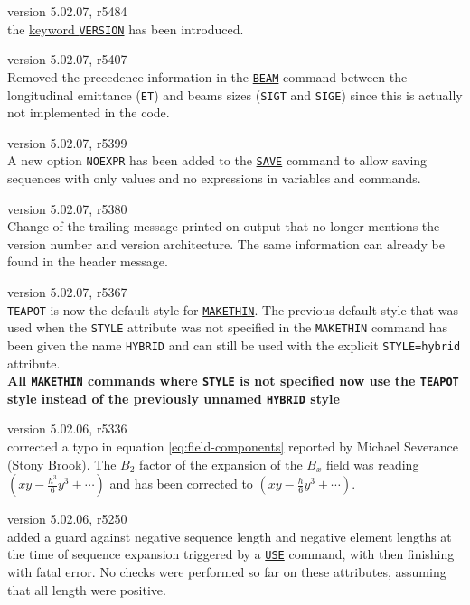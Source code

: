 \begin{madlist}
   version 5.02.07, r5484\\
  the \hyperref[subsec:keyword]{keyword \texttt{VERSION}} has been introduced.
  
   version 5.02.07, r5407\\
  Removed the precedence information in the \hyperref[sec:beam]{\texttt{BEAM}} 
  command between the longitudinal emittance (\texttt{ET}) and beams sizes 
  (\texttt{SIGT} and \texttt{SIGE}) since this is actually not implemented in the 
  code.
  
   version 5.02.07, r5399\\
  A new option \texttt{NOEXPR} has been added to the
  \hyperref[sec:save]{\texttt{SAVE}} command to allow saving sequences
  with only values and no expressions in variables and commands.
  
   version 5.02.07, r5380\\
  Change of the trailing message printed on output that no longer 
  mentions the version number and version architecture. 
  The same information can already be found in the header message.

   version 5.02.07, r5367\\
  \texttt{TEAPOT} is now the default style for 
  \hyperref[chap:makethin]{\texttt{MAKETHIN}}. 
  The previous default style that was used when the \texttt{STYLE} 
  attribute was not specified in the \texttt{MAKETHIN} command 
  has been given the name \texttt{HYBRID} 
  and can still be used with the explicit \texttt{STYLE=hybrid} attribute. \\
  \textbf{All \texttt{MAKETHIN} commands where \texttt{STYLE} is not specified now
  use the \texttt{TEAPOT} style instead of the previously unnamed \texttt{HYBRID} 
  style}

   version 5.02.06, r5336 \\
  corrected a typo in equation \ref{eq:field-components} 
  reported by Michael Severance (Stony Brook). 
  The $B_2$ factor of the expansion of the $B_x$ 
  field was reading $(xy - \frac{h^3}{6}y^3+\cdots)$ 
  and has been corrected to $(xy - \frac{h}{6}y^3+\cdots)$.

   version 5.02.06, r5250\\
  added a guard against negative sequence length and negative 
  element lengths at the time of sequence expansion triggered 
  by a \hyperref[sec:use]{\texttt{USE}} command, with \madx then 
  finishing with fatal error. No checks were performed so far 
  on these attributes, assuming that all length were positive.


\end{madlist}
